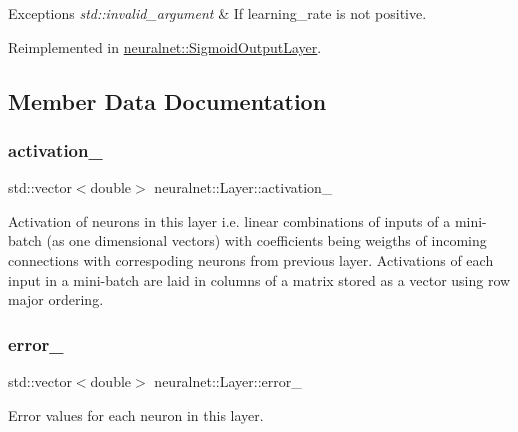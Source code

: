 \begin{DoxyExceptions}{Exceptions}
{\em std\+::invalid\+\_\+argument} & If learning\+\_\+rate is not positive. \\
\hline
\end{DoxyExceptions}


Reimplemented in \hyperlink{classneuralnet_1_1SigmoidOutputLayer_ae5760686dccc5dc3ebd99e5bf7e7a0b0}{neuralnet\+::\+Sigmoid\+Output\+Layer}.



\subsection{Member Data Documentation}
\mbox{\label{classneuralnet_1_1Layer_a848eea2f5878b342484830b311fe0e08}} 
\subsubsection{\texorpdfstring{activation\+\_\+}{activation\_}}
{\footnotesize\ttfamily std\+::vector$<$double$>$ neuralnet\+::\+Layer\+::activation\+\_\+\hspace{0.3cm}{\ttfamily [protected]}}

Activation of neurons in this layer i.\+e. linear combinations of inputs of a mini-\/batch (as one dimensional vectors) with coefficients being weigths of incoming connections with correspoding neurons from previous layer. Activations of each input in a mini-\/batch are laid in columns of a matrix stored as a vector using row major ordering. \mbox{\label{classneuralnet_1_1Layer_a02c84d95e6a9e70e57b4f2b5d5e18ab9}} 
\subsubsection{\texorpdfstring{error\+\_\+}{error\_}}
{\footnotesize\ttfamily std\+::vector$<$double$>$ neuralnet\+::\+Layer\+::error\+\_\+\hspace{0.3cm}{\ttfamily [protected]}}

Error values for each neuron in this layer. \mbox{\label{classneuralnet_1_1Layer_aee4be6e70fb225f18923065940330a26}} 
